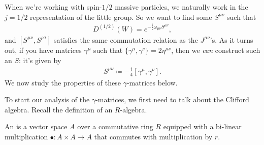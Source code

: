 \documentclass[11pt]{article}
\begin{document}
\begin{eexample}
    When we're working with spin-$1/2$ massive particles, we naturally work
    in the $j = 1/2$ representation of the little group. So we want to find
    some $S^{\mu \nu}$ such that
    \begin{align*}
        D^{(1/2)}(W) = e^{- \frac{i}{2} \omega_{\mu \nu} S^{\mu \nu}},
    \end{align*} 
    and $[S^{\mu \nu}, S^{\rho \sigma}]$ satisfies the same commutation relation
    as the $J^{\mu \nu}$'s. As it turns out, if you have matrices $\gamma^\mu$
    such that $\{ \gamma^\mu, \gamma^\nu \} = 2 \eta^{\mu \nu}$, then we
    \emph{can} construct such an $S$: it's given by
    \begin{align*}
        \boxed{S^{\mu \nu} \coloneqq - \frac{i}{4} [\gamma^\mu, \gamma^\nu].}
    \end{align*}
    We now study the properties of these $\gamma$-matrices below.
\end{eexample}

To start our analysis of the $\gamma$-matrices, we first need to talk 
about the Clifford algebra. Recall the definition of an $R$-algebra.

\begin{definition}
    An  is a vector space $A$ over a commutative ring $R$
    equipped with a bi-linear multiplication $\bullet \colon A \times A \to A$
    that commutes with multiplication by $r$.
\end{definition}
\end{document}

